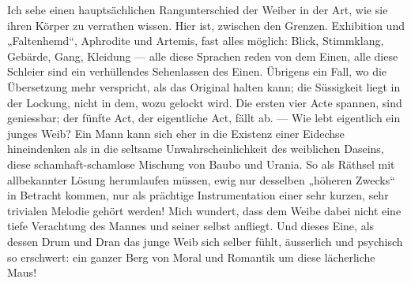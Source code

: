 Ich sehe einen hauptsächlichen Rangunterschied der Weiber in der Art, wie sie ihren Körper zu verrathen wissen. Hier ist, zwischen den Grenzen. Exhibition und „Faltenhemd“, Aphrodite und Artemis, fast alles möglich: Blick, Stimmklang, Gebärde, Gang, Kleidung — alle diese Sprachen reden von dem Einen, alle diese Schleier sind ein verhüllendes Sehenlassen des Einen. Übrigens ein Fall, wo die Übersetzung mehr verspricht, als das Original halten kann; die Süssigkeit liegt in der Lockung, nicht in dem, wozu gelockt wird. Die ersten vier Acte spannen, sind geniessbar; der fünfte Act, der eigentliche Act, fällt ab. — Wie lebt eigentlich ein junges Weib? Ein Mann kann sich eher in die Existenz einer Eidechse hineindenken als in die seltsame Unwahrscheinlichkeit des weiblichen Daseins, diese schamhaft-schamlose Mischung von Baubo und Urania. So als Räthsel mit allbekannter Lösung herumlaufen müssen, ewig nur  desselben „höheren Zwecks“ in Betracht kommen, nur als prächtige Instrumentation einer sehr kurzen, sehr trivialen Melodie gehört werden! Mich wundert, dass dem Weibe dabei nicht eine tiefe Verachtung des Mannes und seiner selbst anfliegt. Und dieses Eine, als dessen Drum und Dran das junge Weib sich selber fühlt, äusserlich und psychisch so erschwert: ein ganzer Berg von Moral und Romantik um diese lächerliche Maus!
\par

